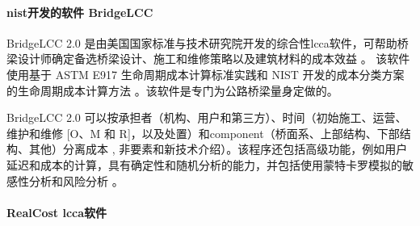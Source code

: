 \paragraph*{\acrfull*{nist}开发的软件 BridgeLCC}
BridgeLCC 2.0 是由美国国家标准与技术研究院开发的综合性\acrlong*{lcca}软件，可帮助桥梁设计师确定备选桥梁设计、施工和维修策略以及建筑材料的成本效益 \cite{ehlen2003b}。 该软件使用基于 ASTM E917 生命周期成本计算标准实践和 NIST 开发的成本分类方案的生命周期成本计算方法 \cite{ehlen2003b}。该软件是专门为公路桥梁量身定做的。

BridgeLCC 2.0 可以按承担者（机构、用户和第三方）、时间（初始施工、运营、维护和维修 [O、M 和 R]，以及处置）和\gls*{component}（桥面系、上部结构、下部结构、其他）分离成本 , 非要素和新技术介绍）。该程序还包括高级功能，例如用户延迟和成本的计算，具有确定性和随机分析的能力，并包括使用蒙特卡罗模拟的敏感性分析和风险分析 \cite{ehlen2003b}。

\paragraph*{RealCost \acrlong*{lcca}软件}

